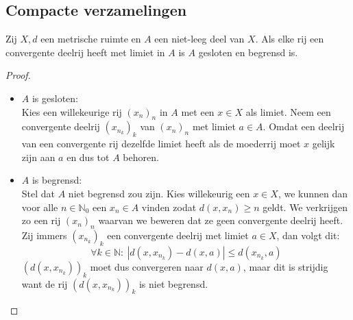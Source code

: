 \documentclass[main.tex]{subfiles}
\begin{document}
\subsection{Compacte verzamelingen}
\label{sec:comp-verz}

\begin{st}
  Zij $X,d$ een metrische ruimte en $A$ een niet-leeg deel van $X$.
  Als elke rij een convergente deelrij heeft met limiet in $A$ is $A$ gesloten en begrensd is.

  \begin{proof}
    \noindent
    \begin{itemize}
    \item $A$ is gesloten:\\
      Kies een willekeurige rij $(x_{n})_{n}$ in $A$ met een $x\in X$ als limiet.
      Neem een convergente deelrij $(x_{n_{k}})_{k}$ van $(x_{n})_{n}$ met limiet $a\in A$.
      Omdat een deelrij van een convergente rij dezelfde limiet heeft als de moederrij moet $x$ gelijk zijn aan $a$ en dus tot $A$ behoren.
    \item $A$ is begrensd:\\
      Stel dat $A$ niet begrensd zou zijn.
      Kies willekeurig een $x\in X$, we kunnen dan voor alle $n\in \mathbb{N}_{0}$ een $x_{n}\in A$ vinden zodat $d(x,x_{n}) \ge n$ geldt.
      We verkrijgen zo een rij $(x_{n})_{n}$ waarvan we beweren dat ze geen convergente deelrij heeft.
      Zij immers $(x_{n_{k}})_{k}$ een convergente deelrij met limiet $a\in X$, dan volgt dit:
      \[ \forall k\in \mathbb{N}:\ |d(x,x_{n_{k}}) -d(x,a)| \le d(x_{n_{k}},a) \]
      $(d(x,x_{n_{k}}))_{k}$ moet dus convergeren naar $d(x,a)$, maar dit is strijdig want de rij $(d(x,x_{n_{k}}))_{k}$ is niet begrensd.
    \end{itemize}
  \end{proof}
\end{st}
\end{document}
